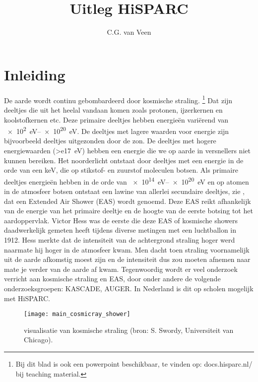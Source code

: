 

\title{Uitleg HiSPARC}
\author{C.G. van Veen}



\maketitle

\section{Inleiding}

De aarde wordt continu gebombardeerd door kosmische straling.
\footnote{Bij dit blad is ook een powerpoint beschikbaar, te vinden op:
docs.hisparc.nl/ bij teaching material.}
Dat zijn deeltjes die uit het heelal vandaan komen zoals protonen, ijzerkernen en
koolstofkernen etc. Deze primaire deeltjes hebben energieën variërend
van \SIrange{e2}{e20}{\electronvolt}. De deeltjes met lagere
waarden voor energie zijn bijvoorbeeld deeltjes uitgezonden door de zon.
De deeltjes met hogere energiewaarden (\SI{>e17}{\electronvolt}) hebben
een energie die we op aarde in versnellers niet kunnen bereiken. Het
noorderlicht ontstaat door deeltjes met een energie in de orde van een
keV, die op stikstof- en zuurstof moleculen botsen. Als primaire
deeltjes energieën hebben in de orde van \SIrange{e14}{e20}
{\electronvolt} en op atomen in de atmosfeer botsen ontstaat een lawine
van allerlei secundaire deeltjes, zie , dat
een Extended Air Shower (EAS) wordt genoemd. Deze EAS reikt afhankelijk
van de energie van het primaire deeltje en de hoogte van de eerste
botsing tot het aardoppervlak. Victor Hess was de eerste die deze EAS of
kosmische showers daadwerkelijk gemeten heeft tijdens diverse metingen
met een luchtballon in 1912. Hess merkte dat de intensiteit van de
achtergrond straling hoger werd naarmate hij hoger in de atmosfeer kwam.
Men dacht toen straling voornamelijk uit de aarde afkomstig moest zijn
en de intensiteit dus zou moeten afnemen naar mate je verder van de
aarde af kwam. Tegenwoordig wordt er veel onderzoek verricht aan
kosmische straling en EAS, door onder andere de volgende
onderzoeksgroepen: KASCADE, AUGER. In Nederland is dit op scholen
mogelijk met HiSPARC.

\begin{figure}
    \centering
    \texttt{[image: main\_cosmicray\_shower]}
    \caption{visualisatie van kosmische straling
             (bron: S. Swordy, Universiteit van Chicago).}
    \label{fig:main_cosmicray_shower}
\end{figure}

